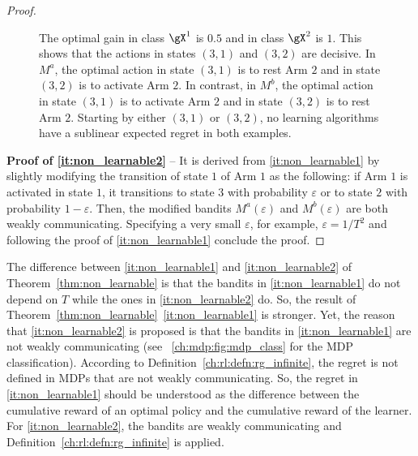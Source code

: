 \begin{proof}
\begin{figure}[hp]
{            The optimal gain in class $\gX^1$ is $0.5$ and in class $\gX^2$ is $1$.
            This shows that the actions in states $(3,1)$ and $(3,2)$ are decisive.
            In $M^a$, the optimal action in state $(3,1)$ is to rest Arm $2$ and in state $(3,2)$ is to activate Arm $2$.
            In contrast, in $M^b$, the optimal action in state $(3,1)$ is to activate Arm $2$ and in state $(3,2)$ is to rest Arm $2$.
            Starting by either $(3,1)$ or $(3,2)$, no learning algorithms have a sublinear expected regret in both examples.
        }
        \label{fig:hard_global}
    \end{figure}

    \textbf{Proof of \ref{it:non_learnable2}} -- It is derived from \ref{it:non_learnable1} by slightly modifying the transition of state $1$ of Arm $1$ as the following: if Arm $1$ is activated in state $1$, it transitions to state $3$ with probability $\varepsilon$ or to state $2$ with probability $1-\varepsilon$.
    Then, the modified bandits $M^a(\varepsilon)$ and $M^b(\varepsilon)$ are both weakly communicating.
    Specifying a very small $\varepsilon$, for example, $\varepsilon=1/T^2$ and following the proof of \ref{it:non_learnable1} conclude the proof. 
\end{proof}

The difference between \ref{it:non_learnable1} and \ref{it:non_learnable2} of Theorem~\ref{thm:non_learnable} is that the bandits in \ref{it:non_learnable1} do not depend on $T$ while the ones in \ref{it:non_learnable2} do.
So, the result of Theorem~\ref{thm:non_learnable}~\ref{it:non_learnable1} is stronger.
Yet, the reason that \ref{it:non_learnable2} is proposed is that the bandits in \ref{it:non_learnable1} are not weakly communicating (see \figurename~\ref{ch:mdp:fig:mdp_class} for the MDP classification).
According to Definition~\ref{ch:rl:defn:rg_infinite}, the regret is not defined in MDPs that are not weakly communicating.
So, the regret in \ref{it:non_learnable1} should be understood as the difference between the cumulative reward of an optimal policy and the cumulative reward of the learner. 
For \ref{it:non_learnable2}, the bandits are weakly communicating and Definition~\ref{ch:rl:defn:rg_infinite} is applied.

